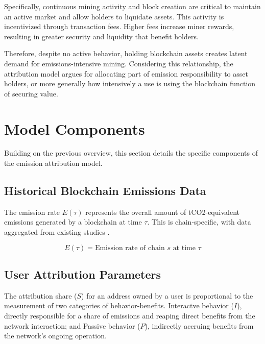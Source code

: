 \documentclass[11pt]{report}
\begin{document}

Specifically, continuous mining activity and block creation are critical to maintain an active market and allow holders to liquidate assets. This activity is incentivized through transaction fees. Higher fees increase miner rewards, resulting in greater security and liquidity that benefit holders.

Therefore, despite no active behavior, holding blockchain assets creates latent demand for emissions-intensive mining. Considering this relationship, the attribution model argues for allocating part of emission responsibility to asset holders, or more generally how intensively a use is using the blockchain function of securing value.

\section{Model Components}

Building on the previous overview, this section details the specific components of the emission attribution model.

\subsection{Historical Blockchain Emissions Data}
The emission rate \(E(\tau)\) represents the overall amount of tCO2-equivalent emissions generated by a blockchain at time $\tau$. This is chain-specific, with data aggregated from existing studies \cite{neumuellerCambridgeBitcoinElectricity2021,stollCarbonFootprintBitcoin2019}.

\begin{equation}
    E(\tau) = \text{Emission rate of chain $s$ at time $\tau$}
    \label{eq:emission_rate}
\end{equation}


\subsection{User Attribution Parameters}

The attribution share ($S$) for an address owned by a user is proportional to the measurement of two categories of behavior-benefits. Interactve behavior ($I$), directly responsible for a share of emissions and reaping direct benefits from the network interaction; and Passive behavior ($P$), indirectly accruing benefits from the network's ongoing operation.
\end{document}
